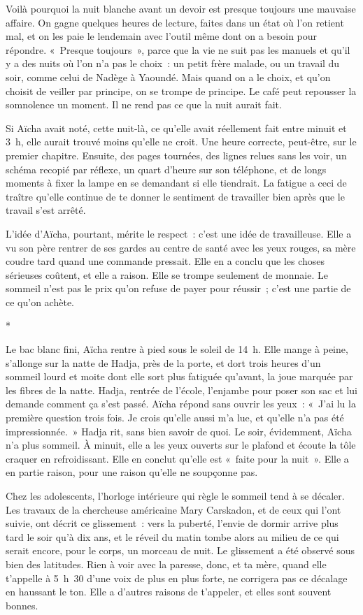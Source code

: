 \documentclass[10.5pt,twoside,openright]{book}
\newcommand{\asterisme}{\par\vspace{0.7em}\centerline{\color{gris}*\quad*\quad*}\vspace{0.7em}\par\noindent}
\begin{document}
Voilà pourquoi la nuit blanche avant un devoir est presque toujours une mauvaise affaire. On gagne quelques heures de lecture, faites dans un état où l’on retient mal, et on les paie le lendemain avec l’outil même dont on a besoin pour répondre. « Presque toujours », parce que la vie ne suit pas les manuels et qu’il y a des nuits où l’on n’a pas le choix : un petit frère malade, ou un travail du soir, comme celui de Nadège à Yaoundé. Mais quand on a le choix, et qu’on choisit de veiller par principe, on se trompe de principe. Le café peut repousser la somnolence un moment. Il ne rend pas ce que la nuit aurait fait.

Si Aïcha avait noté, cette nuit-là, ce qu’elle avait réellement fait entre minuit et 3 h, elle aurait trouvé moins qu’elle ne croit. Une heure correcte, peut-être, sur le premier chapitre. Ensuite, des pages tournées, des lignes relues sans les voir, un schéma recopié par réflexe, un quart d’heure sur son téléphone, et de longs moments à fixer la lampe en se demandant si elle tiendrait. La fatigue a ceci de traître qu’elle continue de te donner le sentiment de travailler bien après que le travail s’est arrêté.

L’idée d’Aïcha, pourtant, mérite le respect : c’est une idée de travailleuse. Elle a vu son père rentrer de ses gardes au centre de santé avec les yeux rouges, sa mère coudre tard quand une commande pressait. Elle en a conclu que les choses sérieuses coûtent, et elle a raison. Elle se trompe seulement de monnaie. Le sommeil n’est pas le prix qu’on refuse de payer pour réussir ; c’est une partie de ce qu’on achète.

\asterisme

Le bac blanc fini, Aïcha rentre à pied sous le soleil de 14 h. Elle mange à peine, s’allonge sur la natte de Hadja, près de la porte, et dort trois heures d’un sommeil lourd et moite dont elle sort plus fatiguée qu’avant, la joue marquée par les fibres de la natte. Hadja, rentrée de l’école, l’enjambe pour poser son sac et lui demande comment ça s’est passé. Aïcha répond sans ouvrir les yeux : « J’ai lu la première question trois fois. Je crois qu’elle aussi m’a lue, et qu’elle n’a pas été impressionnée. » Hadja rit, sans bien savoir de quoi. Le soir, évidemment, Aïcha n’a plus sommeil. À minuit, elle a les yeux ouverts sur le plafond et écoute la tôle craquer en refroidissant. Elle en conclut qu’elle est « faite pour la nuit ». Elle a en partie raison, pour une raison qu’elle ne soupçonne pas.

Chez les adolescents, l’horloge intérieure qui règle le sommeil tend à se décaler. Les travaux de la chercheuse américaine Mary Carskadon, et de ceux qui l’ont suivie, ont décrit ce glissement : vers la puberté, l’envie de dormir arrive plus tard le soir qu’à dix ans, et le réveil du matin tombe alors au milieu de ce qui serait encore, pour le corps, un morceau de nuit. Le glissement a été observé sous bien des latitudes. Rien à voir avec la paresse, donc, et ta mère, quand elle t’appelle à 5 h 30 d’une voix de plus en plus forte, ne corrigera pas ce décalage en haussant le ton. Elle a d’autres raisons de t’appeler, et elles sont souvent bonnes.
\end{document}
